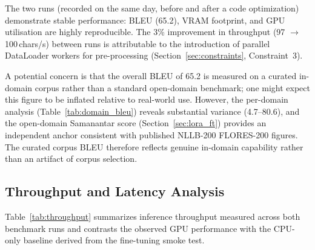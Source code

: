 \documentclass[conference]{IEEEtran}
\begin{document}
The two runs (recorded on the same day, before and after a code optimization)
demonstrate stable performance: BLEU (65.2), VRAM footprint, and GPU utilisation are
highly reproducible. The 3\% improvement in throughput (97 $\to$ 100\,chars/s)
between runs is attributable to the introduction of parallel DataLoader workers
for pre-processing (Section~\ref{sec:constraints}, Constraint~3).

A potential concern is that the overall BLEU of 65.2 is measured on a curated
in-domain corpus rather than a standard open-domain benchmark; one might expect
this figure to be inflated relative to real-world use.
However, the per-domain analysis (Table~\ref{tab:domain_bleu}) reveals substantial
variance (4.7--80.6), and the open-domain Samanantar score (Section~\ref{sec:lora_ft}) provides
an independent anchor consistent with published NLLB-200 FLORES-200 figures.
The curated corpus BLEU therefore reflects genuine in-domain capability rather than
an artifact of corpus selection.

\subsection{Throughput and Latency Analysis}

Table~\ref{tab:throughput} summarizes inference throughput measured across both
benchmark runs and contrasts the observed GPU performance with the CPU-only baseline
derived from the fine-tuning smoke test.

\begin{table}[htbp]
\caption{Inference Throughput and Latency on RTX 5050 (8\,GB VRAM).}
\label{tab:throughput}
\centering
{}
\end{table}
\end{document}

